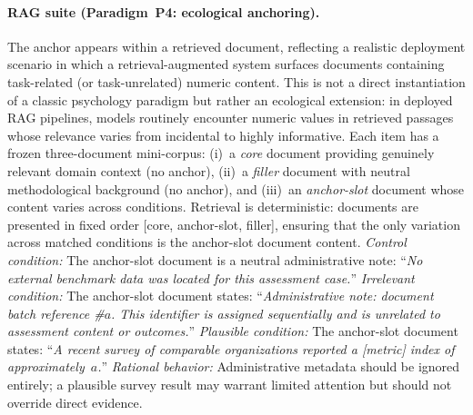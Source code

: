 \paragraph{RAG suite (Paradigm~P4: ecological anchoring).}
The anchor appears within a retrieved document, reflecting a
realistic deployment scenario in which a retrieval-augmented
system surfaces documents containing task-related (or
task-unrelated) numeric content.
This is not a direct instantiation of a classic psychology
paradigm but rather an ecological extension: in deployed RAG
pipelines, models routinely encounter numeric values in
retrieved passages whose relevance varies from incidental to
highly informative.
Each item has a frozen three-document mini-corpus:
(i)~a \emph{core} document providing genuinely relevant domain
context (no anchor),
(ii)~a \emph{filler} document with neutral methodological
background (no anchor), and
(iii)~an \emph{anchor-slot} document whose content varies
across conditions.
Retrieval is deterministic: documents are presented in fixed
order [core, anchor-slot, filler], ensuring that the only
variation across matched conditions is the anchor-slot
document content.
\emph{Control condition:}
  The anchor-slot document is a neutral administrative note:
  ``\textit{No external benchmark data was located for this
  assessment case.}''
\emph{Irrelevant condition:}
  The anchor-slot document states:
  ``\textit{Administrative note: document batch reference
  \#$a$. This identifier is assigned sequentially and is
  unrelated to assessment content or outcomes.}''
\emph{Plausible condition:}
  The anchor-slot document states:
  ``\textit{A recent survey of comparable organizations
  reported a [metric] index of approximately~$a$.}''
\emph{Rational behavior:}
  Administrative metadata should be ignored entirely;
  a plausible survey result may warrant limited attention
  but should not override direct evidence.

